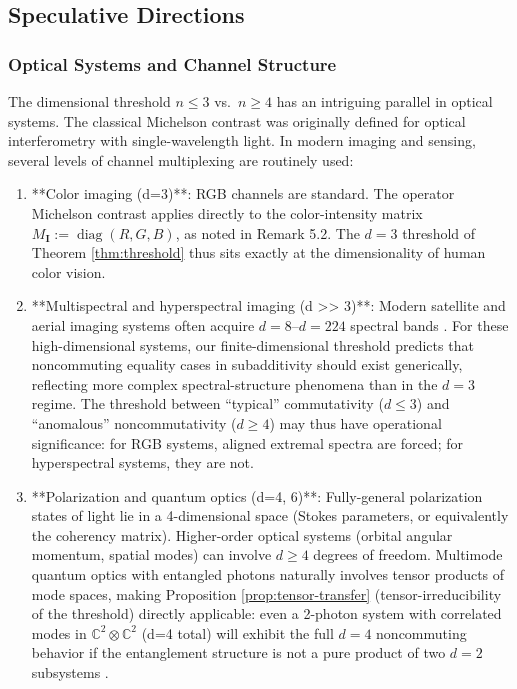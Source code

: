 \documentclass{article}
\theoremstyle{remark}
\begin{document}
\subsection{Speculative Directions}

\subsubsection{Optical Systems and Channel Structure}

The dimensional threshold $n\le3$ vs.\ $n\ge4$ has an intriguing parallel in optical systems. The classical Michelson contrast was originally defined for optical interferometry with single-wavelength light. In modern imaging and sensing, several levels of channel multiplexing are routinely used:

\begin{enumerate}
\item **Color imaging (d=3)**: RGB channels are standard. The operator Michelson contrast applies directly to the color-intensity matrix $M_\mathbf{I}:=\operatorname{diag}(R,G,B)$, as noted in Remark 5.2. The $d=3$ threshold of Theorem \ref{thm:threshold} thus sits exactly at the dimensionality of human color vision.

\item **Multispectral and hyperspectral imaging (d >> 3)**: Modern satellite and aerial imaging systems often acquire $d=8$–$d=224$ spectral bands \cite{goetz1985}. For these high-dimensional systems, our finite-dimensional threshold predicts that noncommuting equality cases in subadditivity should exist generically, reflecting more complex spectral-structure phenomena than in the $d=3$ regime. The threshold between ``typical'' commutativity ($d\le3$) and ``anomalous'' noncommutativity ($d\ge4$) may thus have operational significance: for RGB systems, aligned extremal spectra are forced; for hyperspectral systems, they are not.

\item **Polarization and quantum optics (d=4, 6)**: Fully-general polarization states of light lie in a 4-dimensional space (Stokes parameters, or equivalently the coherency matrix). Higher-order optical systems (orbital angular momentum, spatial modes) can involve $d\ge4$ degrees of freedom. Multimode quantum optics with entangled photons naturally involves tensor products of mode spaces, making Proposition \ref{prop:tensor-transfer} (tensor-irreducibility of the threshold) directly applicable: even a 2-photon system with correlated modes in $\mathbb{C}^2\otimes\mathbb{C}^2$ (d=4 total) will exhibit the full $d=4$ noncommuting behavior if the entanglement structure is not a pure product of two $d=2$ subsystems \cite{raussendorf2003,o2003}.
\end{enumerate}
\end{document}
